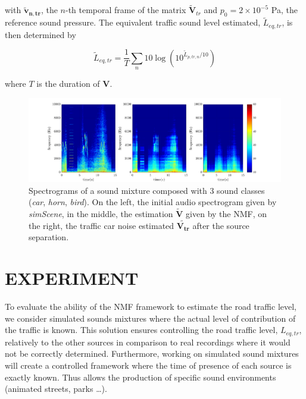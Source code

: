 \documentclass{article}
\begin{document}
\begin{sloppy}
with $\mathbf{\tilde{v}_{n,tr}}$, the $n$-th temporal frame of the matrix $\mathbf{\tilde{V}}_{tr}$ and $ p_{0} = 2\times 10^{-5}$ Pa, the reference sound pressure. The equivalent traffic sound level estimated, $\tilde{L}_{eq,tr}$, is then determined by

\begin{equation}\label{eq:Leq}
\tilde{L}_{eq,tr} = \frac{1}{T} \sum_{n} 10\log \left(10^{\tilde{L}_{p,tr,n}/10}\right)
\end{equation}

where $T$ is the duration of $\mathbf{V}$.\\

\begin{figure}[th!]
\centering
\includegraphics[width=\textwidth]{images/bvak_Sc2_VtrafficApprox_spectre_Euc.pdf}
\caption{Spectrograms of a sound mixture composed with 3 sound classes (\textit{car}, \textit{horn}, \textit{bird}). On the left, the initial audio spectrogram given by \textit{simScene}, in the middle, the estimation $\mathbf{\tilde{V}}$ given by the NMF, on the right, the traffic car noise estimated $\mathbf{\tilde{V_{tr}}}$ after the source separation.}
\label{fig:spectrogram}
\end{figure}

\section{EXPERIMENT}\label{sec:experiment}


To evaluate the ability of the NMF framework to estimate the road traffic level, we consider simulated sounds mixtures where the actual level of contribution of the traffic is known. This solution ensures controlling the road traffic level, $L_{eq,tr}$, relatively to the other sources in comparison to real recordings where it would not be correctly determined. Furthermore, working on simulated sound mixtures will create a controlled framework where the time of presence of each source is exactly known. Thus allows the production of specific sound environments (animated streets, parks \dots). 


\end{sloppy}
\end{document}
